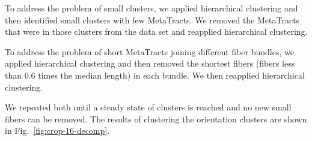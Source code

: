  To address the problem of small clusters, we applied hierarchical clustering and then identified small clusters with few MetaTracts.
 We removed the MetaTracts that were in those clusters from the data set and reapplied hierarchical clustering.

 To address the problem of short MetaTracts joining different fiber bundles, we applied hierarchical clustering and then removed the
shortest fibers (fibers less than 0.6 times the median length) in each bundle. We then reapplied hierarchical clustering.

We repeated both until a steady state of clusters is reached and no new small fibers can be removed. The results of clustering the orientation clusters are shown in Fig.~\ref{fig:crop-16-decomp}.
  
  
  
